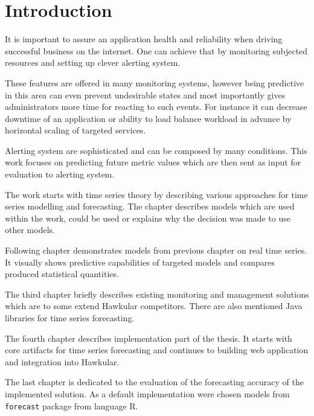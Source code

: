 
%
%
%
\chapter{Introduction} \label{chap:introduction}
It is important to assure an application health and reliability when driving successful business on the internet. One
can achieve that by monitoring subjected resources and setting up clever alerting system.

These features are offered in many monitoring systems, however being predictive in this area can even prevent
undesirable states and most importantly gives administrators more time for reacting to such events. For instance it
can decrease downtime of an application or ability to load balance workload in advance by horizontal scaling of
targeted services.

Alerting system are sophisticated and can be composed by many conditions. This work focuses on predicting future
metric values which are then sent as input for evaluation to alerting system.

The work starts with time series theory by describing various approaches for time series modelling and forecasting.
The chapter describes models which are used within the work, could be used or explains why the decision was made to
use other models.

Following chapter demonstrates models from previous chapter on real time series. It visually shows predictive
capabilities of targeted models and compares produced statistical quantities.

The third chapter briefly describes existing monitoring and management solutions which are to some extend
Hawkular competitors. There are also mentioned Java libraries for time series forecasting.

The fourth chapter describes implementation part of the thesis. It starts with core artifacts for time series
forecasting and continues to building web application and integration into Hawkular.

The last chapter is dedicated to the evaluation of the forecasting accuracy of the implemented solution. As a default
implementation were chosen models from \texttt{forecast} package from language R.

